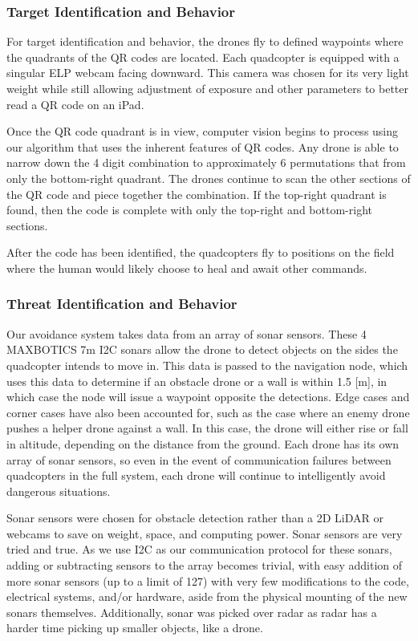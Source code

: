 \documentclass[12pt,letterpaper]{article}
\begin{document}
		\subsubsection*{Target Identification and Behavior}
		For target identification and behavior, the drones fly to defined waypoints where the quadrants of the QR codes are located. Each quadcopter is equipped with a singular ELP webcam facing downward. This camera was chosen for its very light weight while still allowing adjustment of exposure and other parameters to better read a QR code on an iPad.

		Once the QR code quadrant is in view, computer vision begins to process using our algorithm that uses the inherent features of QR codes. Any drone is able to narrow down the 4 digit combination to approximately 6 permutations that from only the bottom-right quadrant. The drones continue to scan the other sections of the QR code and piece together the combination. If the top-right quadrant is found, then the code is complete with only the top-right and bottom-right sections.

		After the code has been identified, the quadcopters fly to positions on the field where the human would likely choose to heal and await other commands.

		\subsubsection*{Threat Identification and Behavior}
		Our avoidance system takes data from an array of sonar sensors. These 4 MAXBOTICS 7m I2C sonars allow the drone to detect objects on the sides the quadcopter intends to move in. This data is passed to the navigation node, which uses this data to determine if an obstacle drone or a wall is within 1.5 [m], in which case the node will issue a waypoint opposite the detections. Edge cases and corner cases have also been accounted for, such as the case where an enemy drone pushes a helper drone against a wall. In this case, the drone will either rise or fall in altitude, depending on the distance from the ground. Each drone has its own array of sonar sensors, so even in the event of communication failures between quadcopters in the full system, each drone will continue to intelligently avoid dangerous situations.

		Sonar sensors were chosen for obstacle detection rather than a 2D LiDAR or webcams to save on weight, space, and computing power. Sonar sensors are very tried and true. As we use I2C as our communication protocol for these sonars, adding or subtracting sensors to the array becomes trivial, with easy addition of more sonar sensors (up to a limit of 127) with very few modifications to the code, electrical systems, and/or hardware, aside from the physical mounting of the new sonars themselves. Additionally, sonar was picked over radar as radar has a harder time picking up smaller objects, like a drone.
\end{document}
